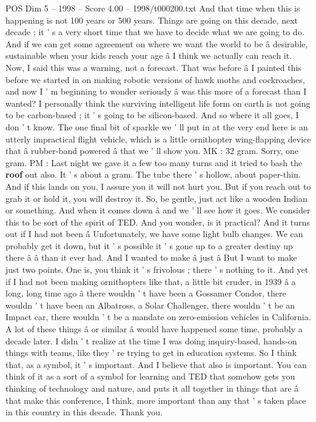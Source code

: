\begin{textsample}{POS Dim 5 – 1998 – Score 4.00 – 1998/t000200.txt}
And that time when this is happening is not 100 years or 500 years.
Things are going on this decade, next decade ; it ' s a very short time that we have to decide what we are going to do.
And if we can get some agreement on where we want the world to be â desirable, sustainable when your kids reach your age â I think we actually can reach it.
Now, I said this was a warning, not a forecast.
That was before â I painted this before we started in on making robotic versions of hawk moths and cockroaches, and now I ' m beginning to wonder seriously â was this more of a forecast than I wanted?
I personally think the surviving intelligent life form on earth is not going to be carbon-based ; it ' s going to be silicon-based.
And so where it all goes, I don ' t know.
The one final bit of sparkle we ' ll put in at the very end here is an utterly impractical flight vehicle, which is a little ornithopter wing-flapping device that â rubber-band powered â that we ' ll show you.
MK : 32 gram.
Sorry, one gram.
PM : Last night we gave it a few too many turns and it tried to bash the \textbf{roof} out also.
It ' s about a gram.
The tube there ' s hollow, about paper-thin.
And if this lands on you, I assure you it will not hurt you.
But if you reach out to grab it or hold it, you will destroy it.
So, be gentle, just act like a wooden Indian or something.
And when it comes down â and we ' ll see how it goes.
We consider this to be sort of the spirit of TED.
And you wonder, is it practical?
And it turns out if I had not been â Unfortunately, we have some light bulb changes.
We can probably get it down, but it ' s possible it ' s gone up to a greater destiny up there â â than it ever had.
And I wanted to make â just â But I want to make just two points.
One is, you think it ' s frivolous ; there ' s nothing to it.
And yet if I had not been making ornithopters like that, a little bit cruder, in 1939 â a long, long time ago â there wouldn ' t have been a Gossamer Condor, there wouldn ' t have been an Albatross, a Solar Challenger, there wouldn ' t be an Impact car, there wouldn ' t be a mandate on zero-emission vehicles in California.
A lot of these things â or similar â would have happened some time, probably a decade later.
I didn ' t realize at the time I was doing inquiry-based, hands-on things with teams, like they ' re trying to get in education systems.
So I think that, as a symbol, it ' s important.
And I believe that also is important.
You can think of it as a sort of a symbol for learning and TED that somehow gets you thinking of technology and nature, and puts it all together in things that are â that make this conference, I think, more important than any that ' s taken place in this country in this decade.
Thank you.

\end{textsample}
